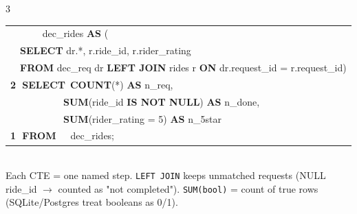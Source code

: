\documentclass[landscape,letterpaper,9pt]{extarticle}
\begin{document}
\begin{multicols*}{3}
{\begin{minipage}{\dimexpr\linewidth-2pt}
{\begin{tabular}{@{}l@{}}
~~~~~~ dec\_rides \textbf{AS} ( \\
~~\textbf{SELECT} dr.*, r.ride\_id, r.rider\_rating \\
~~\textbf{FROM} dec\_req dr \textbf{LEFT JOIN} rides r \textbf{ON} dr.request\_id = r.request\_id) \\
\textcolor{stepWhere}{\textbf{\textcircled{\scriptsize 2} SELECT}~\textbf{COUNT}(*) \textbf{AS} n\_req,} \\
\textcolor{stepWhere}{~~~~~~~~~~~\textbf{SUM}(ride\_id \textbf{IS NOT NULL}) \textbf{AS} n\_done,} \\
\textcolor{stepWhere}{~~~~~~~~~~~\textbf{SUM}(rider\_rating = 5) \textbf{AS} n\_5star} \\
\textcolor{stepFrom}{\textbf{\textcircled{\scriptsize 1} FROM}~~~dec\_rides;} \\
\end{tabular}}
\end{minipage}}
\\[1pt]
\textcolor{cmt}{\scriptsize Each CTE = one named step. \texttt{LEFT JOIN} keeps unmatched requests (NULL ride\_id $\to$ counted as "not completed"). \texttt{SUM(bool)} = count of true rows (SQLite/Postgres treat booleans as 0/1).}


\end{multicols*}
\end{document}
